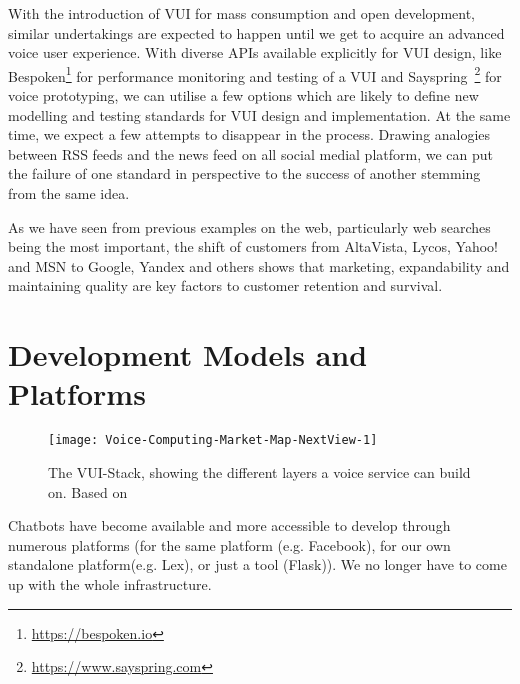 With the introduction of VUI for mass consumption and open development, similar undertakings are expected to happen \cite{alexapc18} until we get to acquire an advanced voice user experience. With diverse APIs available explicitly for VUI design, like Bespoken\footnote{\url{https://bespoken.io}} for performance monitoring and testing of a VUI and Sayspring~\footnote{\url{https://www.sayspring.com}}
for voice prototyping, we can utilise a few options which are likely to define new modelling and testing standards for VUI design and implementation. At the same time, we expect a few attempts to disappear in the process. Drawing analogies between RSS feeds and the news feed on all social medial platform, we can put the failure of one standard in perspective to the success of another stemming from the same idea. 

As we have seen from previous examples on the web, particularly web searches being the most important, the shift of customers from AltaVista, Lycos, Yahoo! and MSN to Google, Yandex and others shows that marketing, expandability and maintaining quality are key factors to customer retention and survival.














\section[Development Models]{Development Models and Platforms}
\label{devmodels}




\begin{wrapfigure}{l}{0.48\textwidth}
	\caption[VUI-Stack]{The VUI-Stack, showing the different layers a voice service can build on. Based on \cite{voicelabs}}
	\label{vuistack}
	\texttt{[image: Voice-Computing-Market-Map-NextView-1]}
\end{wrapfigure}



Chatbots have become available and more accessible to develop through numerous platforms (for the same platform (e.g. Facebook), for our own standalone platform(e.g. Lex), or just a tool (Flask)). We no longer have to come up with the whole infrastructure.




